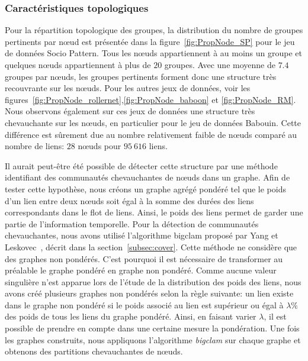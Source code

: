 \subsubsection{Caractéristiques topologiques}
Pour la répartition topologique des groupes, la distribution du nombre de groupes pertinents par n\oe{}ud est présentée dans la figure~\ref{fig:PropNode_SP} pour le jeu de données Socio Pattern.
Tous les n\oe{}uds appartiennent à au moins un groupe et quelques n\oe{}uds appartiennent à plus de $20$ groupes.
Avec une moyenne de $7.4$ groupes par n\oe{}uds, les groupes pertinents forment donc une structure très recouvrante sur les n\oe{}uds.
Pour les autres jeux de données, voir les figures~\ref{fig:PropNode_rollernet},\ref{fig:PropNode_baboon} et \ref{fig:PropNode_RM}.
Nous observons également sur ces jeux de données une structure très chevauchante sur les n\oe{}uds, en particulier pour le jeu de données Babouin.
Cette différence est sûrement due au nombre relativement faible de n\oe{}uds comparé au nombre de liens: $28$ n\oe{}uds pour $95\ 616$ liens.

\bigskip

Il aurait peut-être été possible de détecter cette structure par une méthode identifiant des communautés chevauchantes de n\oe{}uds dans un graphe.
Afin de tester cette hypothèse, nous créons un graphe agrégé pondéré tel que le poids d'un lien entre deux n\oe{}uds soit égal à la somme des durées des liens correspondants dans le flot de liens.
Ainsi, le poids des liens permet de garder une partie de l'information temporelle.
Pour la détection de communautés chevauchantes, nous avons utilisé l'algorithme bigclam proposé par Yang et Leskovec~\cite{Yang2013}, décrit dans la section~\ref{subsec:cover}.
Cette méthode ne considère que des graphes non pondérés.
C'est pourquoi il est nécessaire de transformer au préalable le graphe pondéré en graphe non pondéré.
Comme aucune valeur singulière n'est apparue lors de l'étude de la distribution des poids des liens, nous avons créé plusieurs graphes non pondérés selon la règle suivante:
un lien existe dans le graphe non pondéré si le poids associé au lien est supérieur ou égal à $\lambda\%$ des poids de tous les liens du graphe pondéré.
Ainsi, en faisant varier $\lambda$, il est possible de prendre en compte dans une certaine mesure la pondération.
Une fois les graphes construits, nous appliquons l'algorithme \emph{bigclam} sur chaque graphe et obtenons des partitions chevauchantes de n\oe{}uds.

